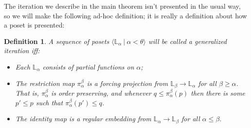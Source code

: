 \documentclass{amsart}
\newtheorem{definition}[theorem]{Definition}
\begin{document}
The iteration we describe in the main theorem isn't presented in the usual way, so we will make the following ad-hoc definition; it is really a definition about how a poset is presented:
\begin{definition}\label{def_GeneralizedIteration}
A sequence of posets $\langle \mathbb{L}_\alpha \ | \ \alpha < \theta \rangle$ will be called a \emph{generalized iteration} iff:
\begin{itemize}
 \item Each $\mathbb{L}_\alpha$ consists of partial functions on $\alpha$;
 \item The restriction map $\pi^\beta_\alpha$ is a forcing projection from $\mathbb{L}_\beta \to \mathbb{L}_\alpha$ for all $\beta \ge \alpha$.  That is, $\pi^\beta_\alpha$ is order preserving, and whenever $q \le \pi^\beta_\alpha(p)$ then there is some $p' \le p$ such that $\pi^\beta_\alpha(p') \le q$.
 \item The identity map is a regular embedding from $\mathbb{L}_\alpha \to \mathbb{L}_\beta$ for all $\alpha \le \beta$.
\end{itemize}
\end{definition}
\end{document}

